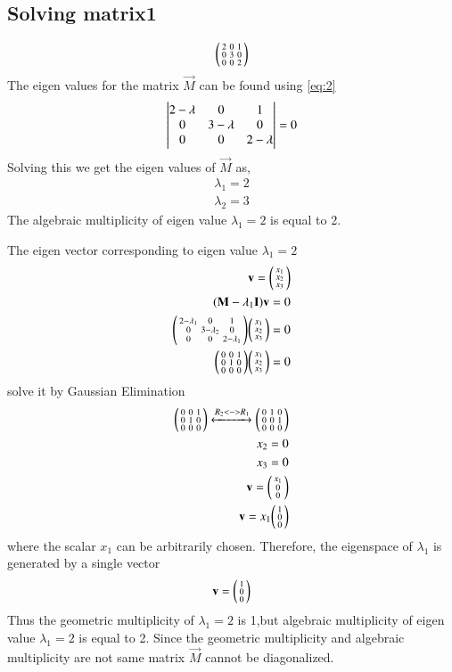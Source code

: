 \documentclass[journal,12pt,twocolumn]{IEEEtran}
\begin{document}
\subsection{Solving matrix1 }
\begin{align}
	\begin{psmallmatrix}2&0&1\\0&3&0\\0 & 0&2\end{psmallmatrix}
\end{align}
The eigen values for the matrix $\vec{M}$ can be found using \eqref{eq:2}
\begin{align}
 \begin{vmatrix}2- \lambda & 0 & 1\\ 0 & 3 -\lambda&0\\0& 0& 2-\lambda\end{vmatrix}=0
\end{align}
Solving this we get the eigen values of $\vec{M}$ as, 
\begin{align}
	\lambda_1 = 2\\
	\lambda_2=  3
\end{align}
The algebraic multiplicity of eigen value $ \lambda_1 = 2$ is equal to 2.

The eigen vector corresponding to eigen value $ \lambda_1 = 2$ 
\begin{align}
	\mathbf{v}=\begin{psmallmatrix}x_1\\ x_2\\x_3\end{psmallmatrix}\\
	{(\mathbf{M}-\lambda_1\mathbf{I})\mathbf{v}}=0\\
	\begin{psmallmatrix}2- \lambda_1&0&1\\0&3-\lambda_2&0\\0&0&2- \lambda_1\end{psmallmatrix}\begin{psmallmatrix}x_1\\ x_2\\x_3\end{psmallmatrix}=0\\
	\begin{psmallmatrix}0&0&1\\0&1&0\\0&0&0\end{psmallmatrix}\begin{psmallmatrix}x_1\\ x_2\\x_3\end{psmallmatrix}=0
\end{align}
solve it by Gaussian Elimination
\begin{align}
	\begin{psmallmatrix}0 & 0 & 1 \\ 0 & 1 & 0\\0&0&0\end{psmallmatrix}
	 \xleftrightarrow{R_2<->R_1}\begin{psmallmatrix}0 & 1 & 0 \\ 0 & 0 & 1 \\0&0&0\end{psmallmatrix}\\
	 x_2=0\\
	 x_3=0\\
	 \mathbf{v}=\begin{psmallmatrix}x_1\\ 0\\0\end{psmallmatrix}\\
	 \mathbf{v}=x_1\begin{psmallmatrix}1\\ 0\\0\end{psmallmatrix}
\end{align}
where the scalar $x_1$ can be arbitrarily chosen. Therefore, the eigenspace of $\lambda _1$ is generated by a single vector
\begin{align}
	\mathbf{v}=\begin{psmallmatrix}1\\ 0\\0\end{psmallmatrix}
\end{align}
Thus the geometric multiplicity of $\lambda _1=2$ is 1,but algebraic multiplicity of eigen value $ \lambda_1 = 2$ is equal to 2.
Since the geometric multiplicity and algebraic multiplicity are not same matrix $\vec{M}$ cannot be diagonalized.
\end{document}
